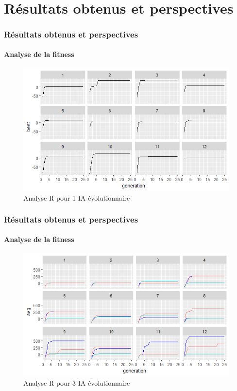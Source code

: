 \section{Résultats obtenus et perspectives}

\begin{frame}
	\frametitle{Résultats obtenus et perspectives}
	\framesubtitle{Analyse de la fitness}
	\begin{figure}[h]
		\centering
		\includegraphics[width=0.9\linewidth]{images/fitness_1_evol}
		\caption{Analyse R pour 1 IA évolutionnaire}
	\end{figure}
\end{frame}

\begin{frame}
	\frametitle{Résultats obtenus et perspectives}
	\framesubtitle{Analyse de la fitness}
	\begin{figure}[h]
		\centering
		\includegraphics[width=0.9\linewidth]{images/fitness_3_evol}
		\caption{Analyse R pour 3 IA évolutionnaire}
	\end{figure}
\end{frame}


